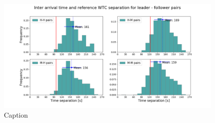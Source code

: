 \begin{figure}
    \centering
    \includegraphics[width=1\textwidth]{graphics/fig_time_separ_HH_HM_MH_MM_pairs.png}
    \caption[list of figures caption]{Caption}
    \label{fig:time_separ_HH_HM_MH_MM_pairs}
\end{figure}


